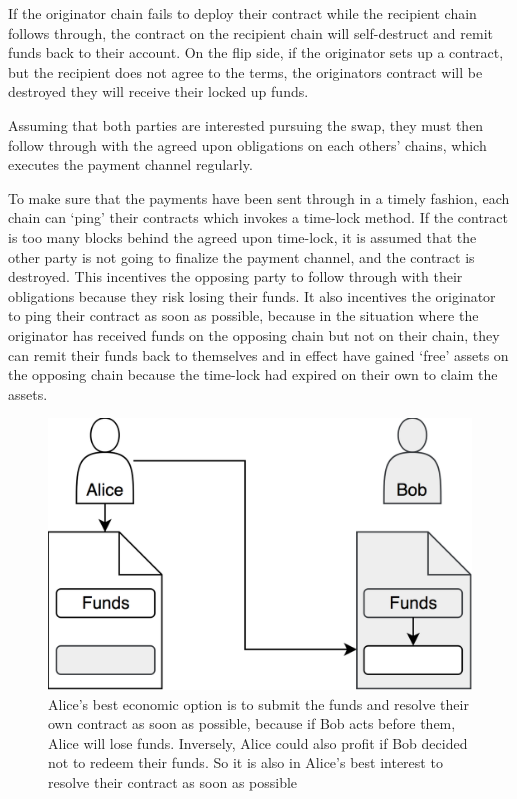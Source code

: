 \documentclass{%
	article}
\begin{document}
If the originator chain fails to deploy their contract while the recipient chain follows through, the contract on the recipient chain will self-destruct and remit funds back to their account. On the flip side, if the originator sets up a contract, but the recipient does not agree to the terms, the originators contract will be destroyed they will receive their locked up funds. 
	
Assuming that both parties are interested pursuing the swap, they must then follow through with the agreed upon obligations on each others’ chains, which executes the payment channel regularly\cite{stellarconsensus}.

To make sure that the payments have been sent through in a timely fashion, each chain can ‘ping’ their contracts which invokes a time-lock method\cite{timelockpuz}. If the contract is too many blocks behind the agreed upon time-lock, it is assumed that the other party is not going to finalize the payment channel, and the contract is destroyed. This incentives the opposing party to follow through with their obligations because they risk losing their funds. It also incentives the originator to ping their contract as soon as possible, because in the situation where the originator has received funds on the opposing chain but not on their chain, they can remit their funds back to themselves and in effect have gained ‘free’ assets on the opposing chain because the time-lock had expired on their own to claim the assets.

\begin{figure}[H]
\centering
\includegraphics[scale=0.112]{fig5.png}
\caption{\small\textnormal{Alice's best economic option is to submit the funds and resolve their own contract as soon as possible, because if Bob acts before them, Alice will lose funds. Inversely, Alice could also profit if Bob decided not to redeem their funds. So it is also in Alice's best interest to resolve their contract as soon as possible}}
\end{figure}
\end{document}
